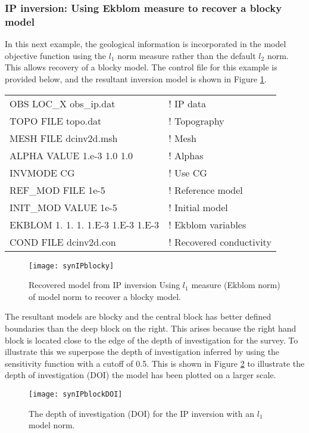\subsubsection{IP inversion: Using Ekblom measure to recover a blocky model}
In this next example, the geological information is incorporated in the model objective function using the $l_1$ norm measure rather than the default $l_2$ norm. This allows recovery of a blocky model. The control file for this example is provided below, and the resultant inversion model is shown in Figure \ref{fig:synIPblocky}.
%
\begin{fileExample}
\begin{tabular}{|ll|}
\hline
OBS LOC\_X obs\_ip.dat & ! IP data \\
TOPO FILE topo.dat & ! Topography\\
MESH FILE dcinv2d.msh & ! Mesh \\
ALPHA VALUE 1.e-3 1.0 1.0 & ! Alphas \\
INVMODE CG & ! Use CG \\
REF\_MOD FILE 1e-5 & ! Reference model \\
INIT\_MOD VALUE 1e-5 & ! Initial model \\
EKBLOM 1. 1. 1. 1.E-3 1.E-3 1.E-3 & ! Ekblom variables \\
COND FILE dcinv2d.con & ! Recovered conductivity \\
\hline
\end{tabular}
\end{fileExample}
%
\begin{figure}
\centering
\texttt{[image: synIPblocky]}
\caption{Recovered model from IP inversion Using $l_1$ measure (Ekblom norm) of model norm to recover a blocky model.}
\label{fig:synIPblocky}
\end{figure}

The resultant models are blocky and the central block has better defined boundaries than the deep block on the right. This arises because the right hand block is located close to the edge of the depth of investigation for the survey. To illustrate this we superpose the depth of investigation inferred by using the sensitivity function with a cutoff of 0.5. This is shown in Figure \ref{fig:synIPblockDOI} to illustrate the depth of investigation (DOI) the model has been plotted on a larger scale.
%
\begin{figure}
\centering
\texttt{[image: synIPblockDOI]}
\caption{The depth of investigation (DOI) for the IP inversion with an $l_1$ model norm.}
\label{fig:synIPblockDOI}
\end{figure}


